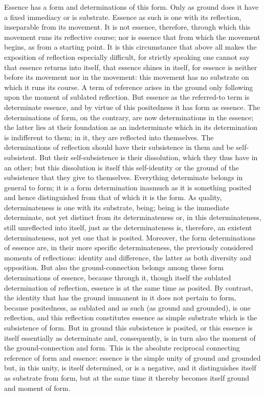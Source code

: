 Essence has a form and determinations of this form.
Only as ground does it have a fixed immediacy or is substrate.
Essence as such is one with its reflection,
inseparable from its movement.
It is not essence, therefore, through which
this movement runs its reflective course;
nor is essence that from which the movement begins,
as from a starting point.
It is this circumstance that above all makes
the exposition of reflection especially difficult,
for strictly speaking one cannot say
that essence returns into itself,
that essence shines in itself,
for essence is neither before its movement nor in the movement:
this movement has no substrate on which it runs its course.
A term of reference arises in the ground only following upon the
moment of sublated reflection.
But essence as the referred-to term is determinate essence,
and by virtue of this positedness it has form as essence.
The determinations of form, on the contrary,
are now determinations in the essence;
the latter lies at their foundation
as an indeterminate which in its determination
is indifferent to them;
in it, they are reflected into themselves.
The determinations of reflection should have
their subsistence in them and be self-subsistent.
But their self-subsistence is their dissolution,
which they thus have in an other;
but this dissolution is itself this self-identity
or the ground of the subsistence that they give to themselves.
Everything determinate belongs in general to form;
it is a form determination inasmuch as it is something posited
and hence distinguished from that of which it is the form.
As quality, determinateness is one with its substrate, being;
being is the immediate determinate,
not yet distinct from its determinateness
or, in this determinateness,
still unreflected into itself,
just as the determinateness is, therefore,
an existent determinateness,
not yet one that is posited.
Moreover, the form determinations of essence are,
in their more specific determinateness,
the previously considered moments of reflections:
identity and difference, the latter as both
diversity and opposition.
But also the ground-connection belongs among
these form determinations of essence,
because through it, though itself the
sublated determination of reflection,
essence is at the same time as posited.
By contrast, the identity that has the ground immanent in it
does not pertain to form, because positedness,
as sublated and as such (as ground and grounded),
is one reflection, and this reflection constitutes
essence as simple substrate which is the subsistence of form.
But in ground this subsistence is posited,
or this essence is itself essentially as determinate and, consequently,
is in turn also the moment of the ground-connection and form.
This is the absolute reciprocal connecting reference of form and essence:
essence is the simple unity of ground and grounded
but, in this unity, is itself determined, or is a negative,
and it distinguishes itself as substrate from form,
but at the same time it thereby becomes itself
ground and moment of form.

